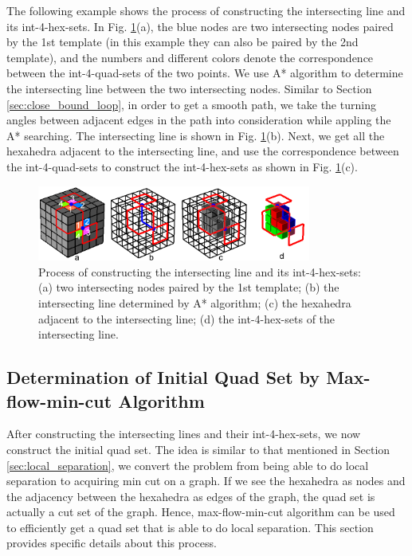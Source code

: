 \documentclass[final,5p,times,twocolumn]{elsarticle}
\begin{document}
The following example shows the process of constructing the intersecting line and its int-4-hex-sets. In Fig. \ref{fig:det_int_line}(a), the blue nodes are two intersecting nodes paired by the 1st template (in this example they can also be paired by the 2nd template), and the numbers and different colors denote the correspondence between the int-4-quad-sets of the two points. We use A* algorithm to determine the intersecting line between the two intersecting nodes. Similar to Section \ref{sec:close_bound_loop}, in order to get a smooth path, we take the turning angles between adjacent edges in the path into consideration while appling the A* searching. The intersecting line is shown in Fig. \ref{fig:det_int_line}(b). Next, we get all the hexahedra adjacent to the intersecting line, and use the correspondence between the int-4-quad-sets to construct the int-4-hex-sets as shown in Fig. \ref{fig:det_int_line}(c).

\begin{figure}[htbp]
\begin{center}
\includegraphics[width=9cm]{figures/det_int_line.png}
\caption{Process of constructing the intersecting line and its int-4-hex-sets: (a) two intersecting nodes paired by the 1st template; (b) the intersecting line determined by A* algorithm; (c) the hexahedra adjacent to the intersecting line; (d) the int-4-hex-sets of the intersecting line.}
\label{fig:det_int_line}
\end{center}
\end{figure}

\subsection{Determination of Initial Quad Set by Max-flow-min-cut Algorithm}
\label{sec:det_init_quad_set}
After constructing the intersecting lines and their int-4-hex-sets, we now construct the initial quad set. The idea is similar to that mentioned in Section \ref{sec:local_separation}, we convert the problem from being able to do local separation to acquiring min cut on a graph. If we see the hexahedra as nodes and the adjacency between the hexahedra as edges of the graph, the quad set is actually a cut set of the graph. Hence, max-flow-min-cut algorithm can be used to efficiently get a quad set that is able to do local separation. This section provides specific details about this process.
\end{document}
